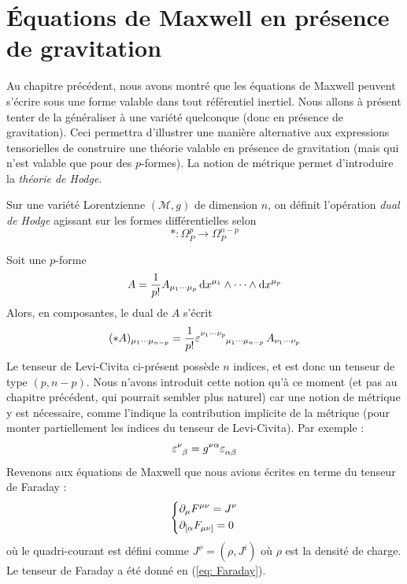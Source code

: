 \section{Équations de Maxwell en présence de gravitation}
Au chapitre précédent, nous avons montré que les équations de Maxwell peuvent s'écrire sous une forme valable dans tout référentiel inertiel. Nous allons à présent tenter de la généraliser à une variété quelconque (donc en présence de gravitation). Ceci permettra d'illustrer une manière alternative aux expressions tensorielles de construire une théorie valable en présence de gravitation (mais qui n'est valable que pour des $p$-formes). La notion de métrique permet d'introduire la \emph{théorie de Hodge}.

\begin{theoremframe}
    \begin{defi}
        Sur une variété Lorentzienne $(\mathcal{M},g)$ de dimension $n$, on définit l'opération \textit{dual de Hodge} agissant sur les formes différentielles selon
        \begin{equation}
            * : \Omega^{p}_{P} \rightarrow \Omega^{n-p}_{P}
        \end{equation}
    \end{defi}
\end{theoremframe}
Soit une $p$-forme
\begin{equation}
    A = \frac{1}{p!}A_{\mu_1 \cdots \mu_p}\,\mathrm{d} x^{\mu_1}\wedge \cdots \wedge \mathrm{d} x^{\mu_p}
\end{equation}
Alors, en composantes, le dual de $A$ s'écrit
\begin{equation}
    (*A)_{\mu_1 \cdots \mu_{n-p}} =  \frac{1}{p!}\varepsilon\indices{^{\nu_1 \cdots \nu_{p}}_{\mu_1 \cdots \mu_{n-p}}}\,A_{\nu_1 \cdots \nu_p}
\end{equation}
Le tenseur de Levi-Civita ci-présent possède $n$ indices, et est donc un tenseur de type $(p,n-p)$. Nous n'avons introduit cette notion qu'à ce moment (et pas au chapitre précédent, qui pourrait sembler plus naturel) car une notion de métrique y est nécessaire, comme l'indique la contribution implicite de la métrique (pour monter partiellement les indices du tenseur de Levi-Civita). Par exemple :
\begin{equation}
    \varepsilon\indices{^\nu_\beta} = g^{\nu \alpha} \varepsilon\indices{_\alpha_\beta}
\end{equation}
Revenons aux équations de Maxwell que nous avions écrites en terme du tenseur de Faraday :
\begin{equation}
\label{eq:maxwell4}
    \begin{dcases}
        \partial_{\mu}F^{\mu \nu} = J^{\nu}\\
        \partial_{[{\alpha}}F_{\mu \nu]} = 0
    \end{dcases}
\end{equation}
où le quadri-courant est défini comme $J^{\nu} = (\rho ,J^{i})$ où $\rho$ est la densité de charge. Le tenseur de Faraday a été donné en (\ref{eq: Faraday}).


